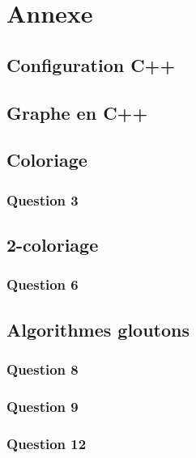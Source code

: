 \section{Annexe}


\subsection*{Configuration C++}



\subsection*{Graphe en C++}





\subsection*{Coloriage}
\subsubsection*{Question 3}



\subsection*{2-coloriage}
\subsubsection*{Question 6}



\subsection*{Algorithmes gloutons}
\subsubsection*{Question 8}

\subsubsection*{Question 9}

\subsubsection*{Question 12}



